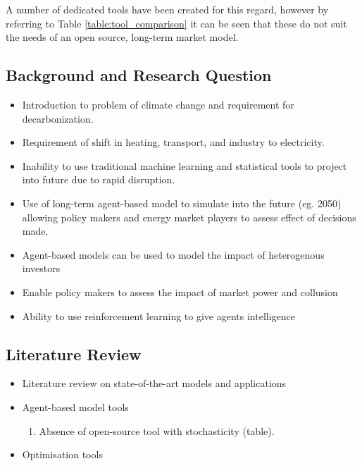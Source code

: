 \documentclass[12pt]{article}
\begin{document}
A number of dedicated tools have been created for this regard, however by referring to Table \ref{table:tool_comparison} it can be seen that these do not suit the needs of an open source, long-term market model.







\subsection{Background and Research Question}




\begin{itemize}
  \item Introduction to problem of climate change and requirement for decarbonization.
  \item Requirement of shift in heating, transport, and industry to electricity.
  \item Inability to use traditional machine learning and statistical tools to project into future due to rapid disruption.
  \item Use of long-term agent-based model to simulate into the future (eg. 2050) allowing policy makers and energy market players to assess effect of decisions made.
  \item Agent-based models can be used to model the impact of heterogenous investors
  \item Enable policy makers to assess the impact of market power and collusion
  \item Ability to use reinforcement learning to give agents intelligence
\end{itemize}

\subsection{Literature Review}

\begin{itemize}
  \item  Literature review on state-of-the-art models and applications
  \item Agent-based model tools
  \begin{enumerate}
  	\item Absence of open-source tool with stochasticity (table).
  \end{enumerate}

  \item Optimisation tools
\end{itemize}
\end{document}
